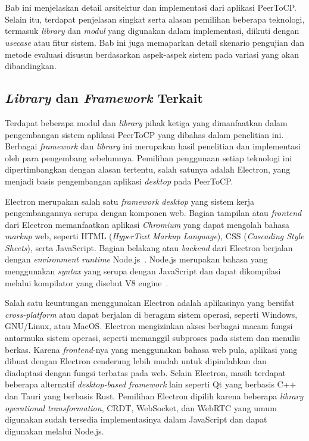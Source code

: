 \chapter{\babEmpat}
\label{bab:4}

Bab ini menjelaskan detail arsitektur dan implementasi dari aplikasi PeerToCP. Selain itu, terdapat penjelasan singkat serta alasan pemilihan beberapa teknologi, termasuk \textit{library} dan \textit{modul} yang digunakan dalam implementasi, diikuti dengan \textit{usecase} atau fitur sistem. Bab ini juga memaparkan detail skenario pengujian dan metode evaluasi disusun berdasarkan aspek-aspek sistem pada variasi yang akan dibandingkan.

\section{\textit{Library} dan \textit{Framework} Terkait}

Terdapat beberapa modul dan \textit{library} pihak ketiga yang dimanfaatkan dalam pengembangan sistem aplikasi PeerToCP yang dibahas dalam penelitian ini. Berbagai \textit{framework} dan \textit{library} ini merupakan hasil penelitian dan implementasi oleh para pengembang sebelumnya. Pemilihan penggunaan setiap teknologi ini dipertimbangkan dengan alasan tertentu, salah satunya adalah Electron, yang menjadi basis pengembangan aplikasi \textit{desktop} pada PeerToCP.

Electron merupakan salah satu \textit{framework} \textit{desktop} yang sistem kerja pengembangannya serupa dengan komponen web. Bagian tampilan atau \textit{frontend} dari Electron memanfaatkan aplikasi \textit{Chromium} yang dapat mengolah bahasa \textit{markup} web, seperti HTML (\textit{HyperText Markup Language}), CSS (\textit{Cascading Style Sheets}), serta JavaScript. Bagian belakang atau \textit{backend} dari Electron berjalan dengan \textit{environment runtime} Node.js~\citep{kredpattanakul2018transforming, miglanielectron}. Node.js merupakan bahasa yang menggunakan \textit{syntax} yang serupa dengan JavaScript dan dapat dikompilasi melalui kompilator yang disebut V8 engine~\citep{tilkov2010node}.

Salah satu keuntungan menggunakan Electron adalah aplikasinya yang bersifat \textit{cross-platform} atau dapat berjalan di beragam sistem operasi, seperti Windows, GNU/Linux, atau MacOS. Electron mengizinkan akses berbagai macam fungsi antarmuka sistem operasi, seperti memanggil subproses pada sistem dan menulis berkas. Karena \textit{frontend}-nya yang menggunakan bahasa web pula, aplikasi yang dibuat dengan Electron cenderung lebih mudah untuk dipindahkan dan diadaptasi dengan fungsi terbatas pada web. Selain Electron, masih terdapat beberapa alternatif \textit{desktop-based framework} lain seperti Qt yang berbasis C++ dan Tauri yang berbasis Rust. Pemilihan Electron dipilih karena beberapa \textit{library} \textit{operational transformation}, CRDT, WebSocket, dan WebRTC yang umum digunakan sudah tersedia implementasinya dalam JavaScript dan dapat digunakan melalui Node.js.

